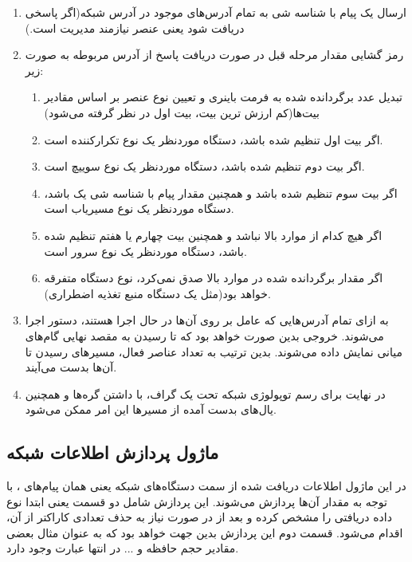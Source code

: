 \begin{enumerate}
    \item ارسال یک پیام  با شناسه شی  به تمام آدرس‌های موجود در آدرس شبکه(اگر پاسخی دریافت شود یعنی عنصر نیازمند مدیریت است.)
    \item رمز گشایی مقدار مرحله قبل در صورت دریافت پاسخ از آدرس مربوطه به صورت زیر:
    \begin{enumerate}
        \item تبدیل عدد برگردانده شده به فرمت باینری و تعیین نوع عنصر بر اساس مقادیر بیت‌ها(کم ارزش ترین بیت، بیت اول در نظر گرفته می‌شود)
        \item اگر بیت اول تنظیم شده باشد، دستگاه موردنظر یک نوع تکرارکننده است.
        \item اگر بیت دوم تنظیم شده باشد، دستگاه موردنظر یک نوع سوییچ است.
        \item اگر بیت سوم تنظیم شده باشد و همچنین مقدار پیام  با شناسه شی  یک باشد، دستگاه موردنظر یک نوع مسیریاب است.
        \item اگر هیچ کدام از موارد بالا نباشد و همچنین بیت چهارم یا هفتم تنظیم شده باشد، دستگاه موردنظر یک نوع سرور است.
        \item اگر مقدار برگردانده شده در موارد بالا صدق نمی‌کرد، نوع دستگاه متفرقه خواهد بود(مثل یک دستگاه منبع تغذیه اضطراری). 
    \end{enumerate}
    \item به ازای تمام آدرس‌هایی که عامل  بر روی آن‌ها در حال اجرا هستند، دستور  اجرا می‌شوند. خروجی بدین صورت خواهد بود که تا رسیدن به مقصد نهایی گام‌های میانی نمایش داده می‌شوند. بدین ترتیب به تعداد عناصر فعال، مسیرهای رسیدن تا آن‌ها بدست می‌آیند.
    \item در نهایت برای رسم توپولوژی شبکه تحت یک گراف، با داشتن گره‌ها و همچنین یال‌های بدست آمده از مسیرها این امر ممکن می‌شود.
\end{enumerate}




\subsection{ماژول پردازش اطلاعات شبکه}

در این ماژول اطلاعات دریافت شده از سمت دستگاه‌های شبکه یعنی همان پیام‌های ، با توجه به مقدار آن‌ها پردازش می‌شوند. این پردازش شامل دو قسمت یعنی ابتدا نوع داده دریافتی را مشخص کرده و بعد از در صورت نیاز به حذف تعدادی کاراکتر از آن، اقدام می‌شود. قسمت دوم این پردازش بدین جهت خواهد بود که به عنوان مثال بعضی مقادیر حجم حافظه و ... در انتها عبارت  وجود دارد.

